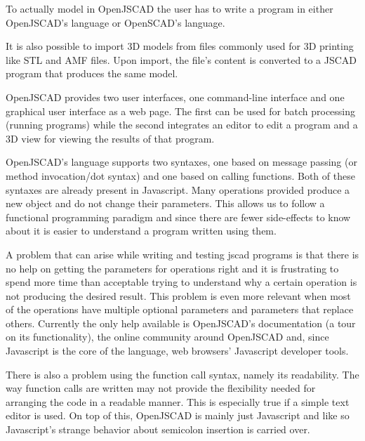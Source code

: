 \documentclass{./llncs2e/llncs}
\begin{document}
	To actually model in OpenJSCAD the user has to write a program in either OpenJSCAD's language or OpenSCAD's language.

	It is also possible to import 3D models from files commonly used for 3D printing like STL and AMF files.
	Upon import, the file's content is converted to a JSCAD program that produces the same model. 

	OpenJSCAD provides two user interfaces, one command-line interface and one graphical user interface as a web page.
	The first can be used for batch processing (running programs) while the second integrates an editor to edit a program and a 3D view for viewing the results of that program.

	OpenJSCAD's language supports two syntaxes, one based on message passing (or method invocation/dot syntax) and one based on calling functions.
	Both of these syntaxes are already present in Javascript. 
	Many operations provided produce a new object and do not change their parameters. 
	This allows us to follow a functional programming paradigm and since there are fewer side-effects to know about it is easier to understand a program written using them.

	A problem that can arise while writing and testing jscad programs is that there is no help on getting the parameters for operations right and it is frustrating to spend more time than acceptable trying to understand why a certain operation is not producing the desired result. 
	This problem is even more relevant when most of the operations have multiple optional parameters and parameters that replace others. 
	Currently the only help available is OpenJSCAD's documentation (a tour on its functionality), the online community around OpenJSCAD and, since Javascript is the core of the language, web browsers' Javascript developer tools.

	There is also a problem using the function call syntax, namely its readability.
	The way function calls are written may not provide the flexibility needed for arranging the code in a readable manner. 
	This is especially true if a simple text editor is used. 
	On top of this, OpenJSCAD is mainly just Javascript and like so Javascript's strange behavior about semicolon insertion is carried over. 

\end{document}
